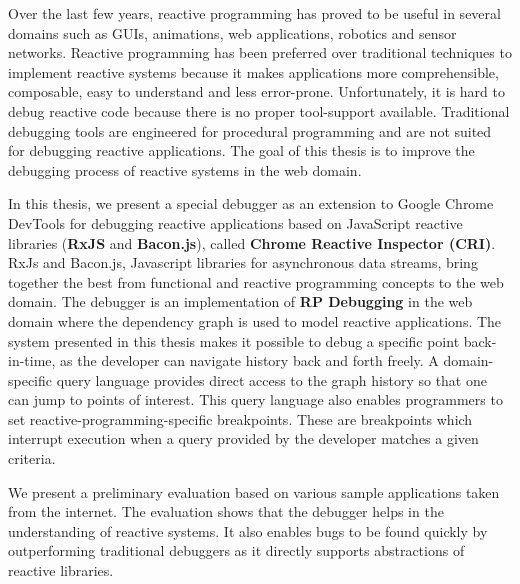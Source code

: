Over the last few years, reactive programming has proved to be useful in several domains such as GUIs, animations, web applications, robotics and sensor networks. Reactive programming has been preferred over traditional techniques to implement reactive systems because it makes applications more comprehensible, composable, easy to understand and less error-prone. Unfortunately, it is hard to debug reactive code because there is no proper tool-support available. Traditional debugging tools are engineered for procedural programming and are not suited for debugging reactive applications. The goal of this thesis is to improve the debugging process of reactive systems in the web domain.

In this thesis, we present a special debugger as an extension to Google Chrome DevTools for debugging reactive applications based on JavaScript reactive libraries (\textbf{RxJS} and \textbf{Bacon.js}), called \textbf{Chrome Reactive Inspector (CRI)}. RxJs and Bacon.js, Javascript libraries for asynchronous data streams, bring together the best from functional and reactive programming concepts to the web domain. The debugger is an implementation of \textbf{RP Debugging} in the web domain where the dependency graph is used to model reactive applications.
The system presented in this thesis makes it possible to debug a specific point back-in-time, as the developer can navigate history back and forth freely. A domain-specific query language provides direct access to the graph history so that one can jump to points of interest. This query language also enables programmers to set reactive-programming-specific breakpoints. These are breakpoints which interrupt execution when a query provided by the developer matches a given criteria.

We present a preliminary evaluation based on various sample applications taken from the internet. The evaluation shows that the debugger helps in the understanding of reactive systems. It also enables bugs to be found quickly by outperforming traditional debuggers as it directly supports abstractions of reactive libraries.